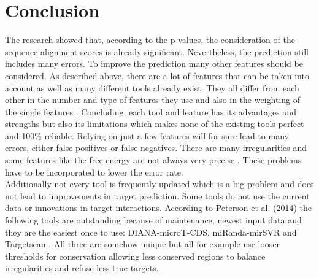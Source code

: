 \documentclass[12pt,  a4paper]{report}
\begin{document}
\vspace{2cm}



\chapter{Conclusion}
\label{chapter:conlusion}

The research showed that, according to the p-values, the consideration of the sequence alignment scores is already significant. Nevertheless, the prediction still includes many errors. To improve the prediction many other features should be considered.
As described above, there are a lot of features that can be taken into account as well as many different tools already exist. They all differ from each other in the number and type of features they use and also in the weighting of the single features \cite{Peterson}. Concluding, each tool and feature has its advantages and strengths but also its limitations which makes none of the existing tools perfect and 100\% reliable. Relying on just a few features will for sure lead to many errors, either false positives or false negatives. There are many irregularities and some features like the free energy are not always very precise \cite{Peterson}. These problems have to be incorporated to lower the error rate.\\

Additionally not every tool is frequently updated which is a big problem and does not lead to improvements in target prediction. Some tools do not use the current data or innovations in target interactions. According to Peterson et al. (2014) the following tools are outstanding because of maintenance, newest input data and they are the easiest once to use: DIANA-microT-CDS, miRanda-mirSVR and Targetscan \cite{Peterson}. All three are somehow unique but all for example use looser thresholds for conservation allowing less conserved regions to balance irregularities and refuse less true targets.\\
\end{document}
